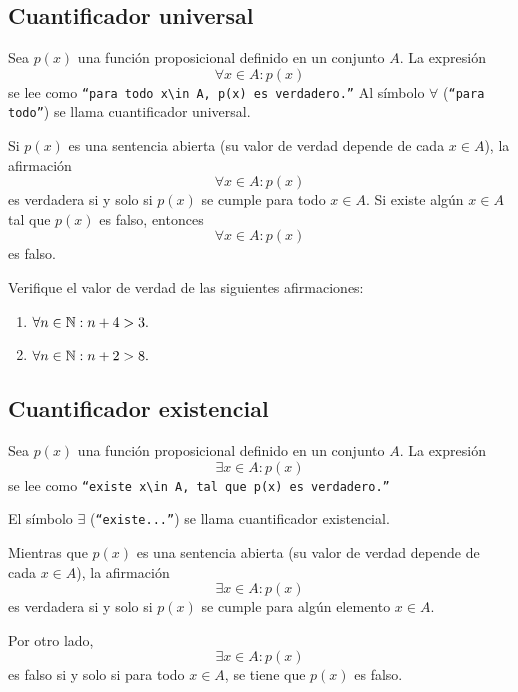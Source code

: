 \subsection{Cuantificador universal}


 Sea $p(x)$ una función proposicional definido en un conjunto $A.$ La expresión
 \[
 \label{lip:4.1}
   \forall x \in A: p(x)
 \] 
 se lee como  \texttt{``para todo $x\in A,$ $p(x)$ es verdadero.''}  Al símbolo $\forall$ (\texttt{``para todo''}) se llama cuantificador universal.

 Si $p(x)$ es una sentencia abierta (su valor de verdad depende de cada $x\in A$), la afirmación 
 $$\forall x\in A: p(x)$$ es verdadera si y solo si $p(x)$ se cumple para todo $x\in A.$  Si existe algún $x\in A$ tal que $p(x)$ es falso, entonces $$\forall x\in A: p(x)$$ es falso.



 \begin{problema}
  \label{lip:exmp:4.8}
  Verifique el valor de verdad de las siguientes afirmaciones:
  \begin{enumerate}
   \item $\forall n \in \mathbb{N}: n+4>3.$ 
   \item $\forall n \in \mathbb{N}: n+2>8.$
  \end{enumerate}

 \end{problema}



\subsection{Cuantificador existencial}


 Sea $p(x)$ una función proposicional definido en un conjunto $A.$ La expresión
 \[
 \label{lip:4.3}
   \exists x \in A: p(x)
 \] 
 se lee como  \texttt{``existe $x\in A,$ tal que $p(x)$ es verdadero.''}  
 
 El símbolo $\exists$ (\texttt{``existe...''}) se llama cuantificador existencial.




 Mientras que $p(x)$ es una sentencia abierta (su valor de verdad depende de cada $x\in A$), la afirmación 
 $$\exists x\in A: p(x)$$ es verdadera si y solo si $p(x)$ se cumple para algún elemento $x\in A.$  



 Por otro lado,  $$\exists x\in A: p(x)$$ es falso si y solo si para todo $ x\in A $, se tiene que $ p(x) $ es falso.



